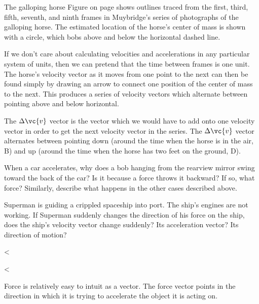 \begin{eg}{The galloping horse}\label{eg:horse-outlines}
Figure  on page \pageref{fig:horse-outlines}
shows outlines traced from the first, third,
fifth, seventh, and ninth frames in Muybridge's series of
photographs of the galloping horse. The estimated location
of the horse's center of mass is shown with a circle, which
bobs above and below the horizontal dashed line.

   If we don't care about calculating velocities and
accelerations in any particular system of units, then we can
pretend that the time between frames is one unit. The
horse's velocity vector as it moves from one point to the
next can then be found simply by drawing an arrow to connect
one position of the center of mass to the next. This
produces a series of velocity vectors which alternate
between pointing above and below horizontal.

   The $\Delta\vc{v}$ vector is the vector which we would have
to add onto one velocity vector in order to get the next
velocity vector in the series. The $\Delta\vc{v}$ vector
alternates between pointing down (around the time when the
horse is in the air, B) and up (around the time when the
horse has two feet on the ground, D).
\end{eg}

\startdqs

\begin{dq}
When a car accelerates, why does a bob hanging from the
rearview mirror swing toward the back of the car? Is it
because a force throws it backward? If so, what force?
Similarly, describe what happens in the other cases described above.
\end{dq}

\begin{dq}
Superman is guiding a crippled spaceship into port. The ship's
engines are not working. If Superman suddenly changes the direction
of his force on the ship, does the ship's velocity vector change
suddenly? Its acceleration vector? Its direction of motion?
\end{dq}


<%

\vfill

<%

Force is relatively easy to intuit as a vector. The force
vector points in the direction in which it is trying to
accelerate the object it is acting on.

